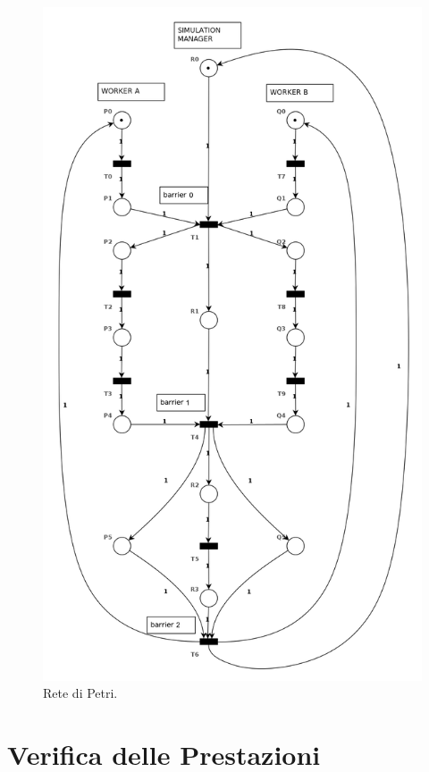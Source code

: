 \documentclass[12pt,a4paper,openright,twoside]{book}
\begin{document}
\begin{figure}
	\centering
	\includegraphics[width=0.9\linewidth]{figures/petri-net.png}
	\caption{Rete di Petri.}
	\label{fig:petri-net}
\end{figure}

\chapter{Verifica delle Prestazioni} %
\label{chap:Verifica delle Prestazioni}
\end{document}
